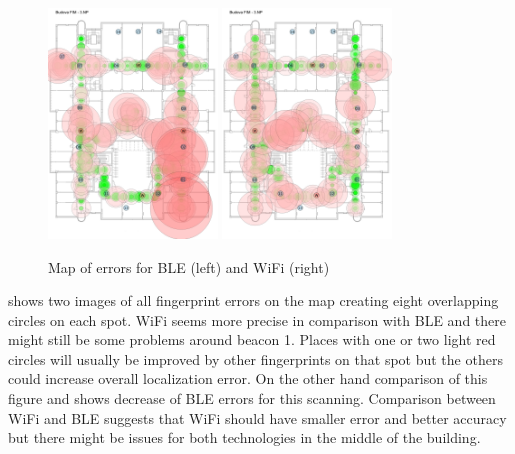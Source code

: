 \begin{figure}[h!]
	\begin{centering}
		\includegraphics[width=0.4\textwidth]{img/third_data_collection_ble_errors}
		\includegraphics[width=0.4\textwidth]{img/third_data_collection_wifi_errors}
		\par\end{centering}
	\caption{Map of errors for BLE (left) and WiFi (right)}
	\label{fig03c06}
\end{figure}

 shows two images of all fingerprint errors on the map creating eight overlapping circles on each spot. WiFi seems more precise in comparison with BLE and there might still be some problems around beacon 1. Places with one or two light red circles will usually be improved by other fingerprints on that spot but the others could increase overall localization error. On the other hand comparison of this figure and  shows decrease of BLE errors for this scanning. Comparison between WiFi and BLE suggests that WiFi should have smaller error and better accuracy but there might be issues for both technologies in the middle of the building.

